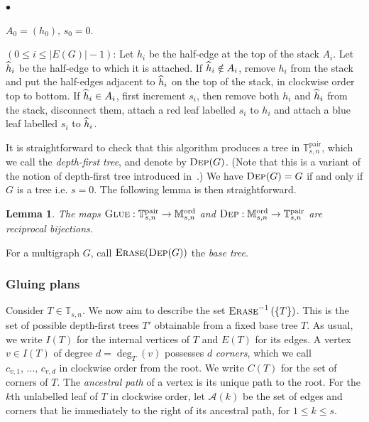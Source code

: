 \documentclass[10pt]{amsart}
\newtheorem{lemm}[theo]{Lemma}\newtheorem{prop}[theo]{Proposition}\newtheorem{coro}[theo]{Corollary}\newtheorem{conj}[theo]{Conjecture}
\theoremstyle{definition}\newtheorem{defi}[theo]{Definition}\newtheorem{rema}[theo]{Remark}\newtheorem{exam}[theo]{Example}\newtheorem{exem}[theo]{Example}\newtheorem{nota}[theo]{Notation}
\newenvironment{steplist} {
\begin{list}
{$\bullet$} {\setlength{\labelwidth}{100pt}
\setlength{\leftmargin}{80pt}
\setlength{
\itemsep}{\parsep}}} {\end{list}}
\newcommand{\ord}{\mathrm{ord}}
\newcommand{\pair}{\mathrm{pair}}
\newcommand{\cA}{\mathcal{A}}
\newcommand{\A}{\mathbb{T}}
\newcommand{\M}{\mathbb{M}}
\let\oldhat\hat
\renewcommand*{\hat}[1]{\mathchoice{\widehat{#1}}{\widehat{#1}}{\oldhat{#1}}{\oldhat{#1}}}
\begin{document}
\begin{steplist}
\item[{\sc Initialization}] $A_0=(h_0)$, $s_0 = 0$.
\item[{\sc Step $i$}\hspace{38pt}]$(0\leq i\leq |E(G)|-1)$: Let $h_{i}$ be the half-edge at the top of the stack $A_i$. Let $\hat{h}_i$ be the half-edge to which it is attached. If $\hat{h}_i\notin A_i$, remove $h_i$ from the stack and put the half-edges adjacent to $\hat{h}_i$ on the top of the stack, in clockwise order top to bottom. If $\hat{h}_i\in A_i$, first increment $s_i$, then remove both $h_i$ and $\hat{h}_i$ from the stack, disconnect them, attach a red leaf labelled $s_i$ to $h_i$ and attach a blue leaf labelled $s_i$ to $\hat{h}_i$.
\end{steplist} It is straightforward to check that this algorithm produces a tree in $\A_{s,n}^{\pair}$, which we call the \emph{depth-first tree}, and denote by $\textsc{Dep}(G)$. (Note that this is a variant of the notion of depth-first tree introduced in~\cite{ABBrGo12}.) We have $\textsc{Dep}(G)=G$ if and only if $G$ is a tree i.e. $s=0$. The following lemma is then straightforward.

\begin{lemm}
The maps $\textsc{Glue}:\A_{s,n}^{\pair}\rightarrow\M_{s,n}^{\ord}$ and $\textsc{Dep}:\M_{s,n}^{\ord}\rightarrow\A_{s,n}^{\pair}$ are reciprocal bijections.
\end{lemm}

For a multigraph $G$, call $\textsc{Erase}(\textsc{Dep}(G))$ the \emph{base tree}.

\subsubsection{Gluing plans}
Consider $T\in \A_{s,n}$. We now aim to describe the set $\textsc{Erase}^{-1}\left(\{T\}\right)$. This is the set of possible depth-first trees $T'$ obtainable from a fixed base tree $T$. As usual, we write $I(T)$ for the internal vertices of $T$ and $E(T)$ for its edges. A vertex $v \in I(T)$ of degree $d=\deg_T(v)$ possesses $d$ \emph{corners}, which we call $c_{v,1}, \,\ldots,\,c_{v,d}$ in clockwise order from the root. We write $C(T)$ for the set of corners of $T$. The \emph{ancestral path} of a vertex is its unique path to the root. For the $k$th unlabelled leaf of $T$ in clockwise order, let $\cA(k)$ be the set of edges and corners that lie immediately to the right of its ancestral path, for $1 \le k \le s$.
\end{document}
